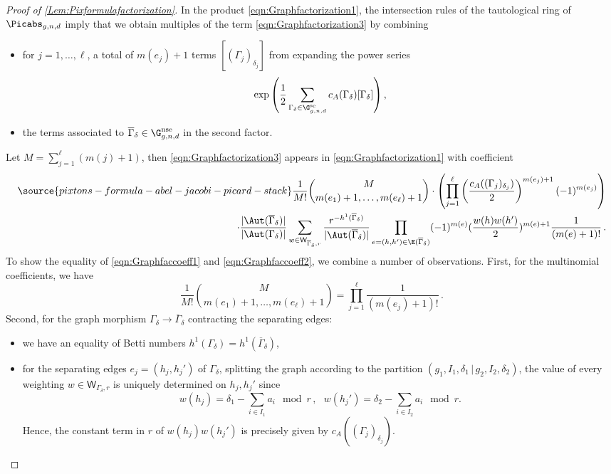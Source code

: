 \begin{proof}[Proof of \cref{Lem:Pixformulafactorization}]
In the product \eqref{eqn:Graphfactorization1}, the intersection rules of the tautological ring of $\Picabs_{g,n,d}$ imply that we obtain multiples of the term \eqref{eqn:Graphfactorization3} by combining
\begin{itemize}
    \item for $j=1, \ldots, \ell$, a total of $m(e_j)+1$ terms $[(\Gamma_j)_{\delta_j}]$ from expanding the power series \[\exp\left(\frac12  \sum_{\Gamma_\delta \in \G_{g,n,d}^\textup{se}} c_A(\Gamma_\delta) [\Gamma_\delta]  \right),\]
    \item the terms associated to $\overline{\Gamma}_{\delta} \in \G_{g,n,d}^\textup{nse}$ in the second factor.
\end{itemize}
Let $M=\sum_{j=1}^\ell (m(j)+1)$, then \eqref{eqn:Graphfactorization3} appears in \eqref{eqn:Graphfactorization1} with coefficient
\begin{align} \label{eqn:Graphfaccoeff2}
\source{pixtons-formula-abel-jacobi-picard-stack}
    \frac{1}{M!}\binom{M}{m(e_1)+1, \ldots, m(e_\ell)+1} \cdot \left( \prod_{j=1}^\ell \left(\frac{c_A((\Gamma_j)_{\delta_j})}{2}\right)^{m(e_j)+1} (-1)^{m(e_j)} \right)\\ \nonumber \cdot \frac{|\Aut(\overline{\Gamma}_\delta)|}{|\Aut({\Gamma}_\delta)|} \sum_{
w\in \mathsf{W}_{\overline{\Gamma}_\delta,r}}
\frac{r^{-h^1(\overline{\Gamma}_\delta)}}{|\Aut(\overline{\Gamma}_\delta)| }
\prod_{e=(h,h')\in \E(\overline{\Gamma}_\delta)}
 (-1)^{m(e)} (\frac{w(h)w(h')}{2})^{m(e)+1} \frac{1}{(m(e)+1)!}\, .
\end{align}
To show the equality of \eqref{eqn:Graphfaccoeff1} and \eqref{eqn:Graphfaccoeff2}, we combine a number of observations. First, for the multinomial coefficients, we have
\[\frac{1}{M!}\binom{M}{m(e_1)+1, \ldots, m(e_\ell)+1} = \prod_{j=1}^\ell \frac{1}{(m(e_j)+1)!}\, .\]
Second, for the graph morphism $\Gamma_\delta \to \overline{\Gamma}_\delta$ contracting the separating edges:
\begin{itemize}
    \item we have an equality of Betti numbers $h^1(\Gamma_\delta) = h^1(\overline{\Gamma}_\delta)$,
    \item for the separating edges $e_j=(h_j, h_j')$ of  $\Gamma_\delta$, splitting the graph according to the partition $(g_1, I_1, \delta_1\,  | \, g_2, I_2, \delta_2)$, the value of every weighting $w\in \mathsf{W}_{\Gamma_\delta,r}$ is uniquely determined on $h_j, h_j'$ since
    \[w(h_j) = \delta_1 - \sum_{i \in I_1} a_i   \mod r\, ,\ \ \  w(h_j') = \delta_2 - \sum_{i \in I_2} a_i   \mod r.\] Hence, the constant term in $r$ of $w(h_j) w(h_j')$ is precisely given by $c_A((\Gamma_j)_{\delta_j})$.

\end{itemize}
\end{proof}
